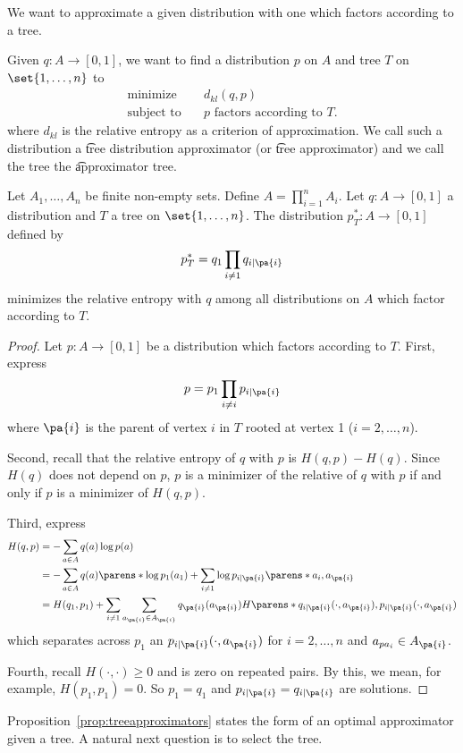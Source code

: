 

We want to approximate a given distribution with one which factors according to a tree.


Given $q: A \to [0, 1]$, we want to find a distribution $p$ on $A$ and tree $T$ on $\set{1, \dots , n}$ to
  \[
\begin{aligned}
\text{minimize} & \quad d_{kl}(q, p) \\
\text{subject to} & \quad p \text{ factors according to } T.
\end{aligned}
  \]
where $d_{kl}$ is the relative entropy as a criterion of approximation.
We call such a distribution a \t{tree distribution approximator} (or \t{tree approximator}) and we call the tree the \t{approximator tree}.


\begin{prop}

Let $A_1, \dots , A_n$ be finite non-empty sets.
Define $A = \prod_{i = 1}^{n} A_i$.
Let $q: A \to [0, 1]$ a distribution and $T$ a tree on $\set{1, \dots , n}$.
The distribution $p^*_T: A \to [0, 1]$ defined by
  \[
p^*_T = q_1 \prod_{i \neq 1} q_{i \mid \pa{i}}
  \]
minimizes the relative entropy with $q$ among all distributions on $A$ which factor according to $T$.

\begin{proof}

Let $p: A \to [0, 1]$ be a distribution which factors according to $T$.
First, express
  \[
p = p_1 \prod_{i \neq i} p_{i \mid \pa{i}}
  \]
where $\pa{i}$ is the parent of vertex $i$ in $T$ rooted at vertex 1 ($i = 2, \dots , n$).

Second, recall that the relative entropy of $q$ with $p$ is $H(q, p) - H(q)$.
Since $H(q)$ does not depend on $p$, $p$ is a minimizer of the relative of $q$ with $p$ if and only if $p$ is a minimizer of $H(q, p)$.

Third, express
  \[
\begin{aligned}
H(q, p) &= - \sum_{a \in A} q(a) \log p(a) \\
&= - \sum_{a \in A} q(a) \parens*{\log p_1(a_1) + \sum_{i \neq 1} \log p_{i \mid \pa{i}}\parens*{a_i, a_{\pa{i}}}} \\
&= H(q_1, p_1) + \sum_{i \neq 1} \sum_{a_{\pa{i}} \in A_{\pa{i}}} q_{\pa{i}}(a_{\pa{i}})H\parens*{q_{i\mid\pa{i}}(\cdot, a_{\pa{i}}), p_{i\mid\pa{i}}(\cdot, a_{\pa{i}})}
\end{aligned}
  \]
which separates across $p_1$ an $p_{i \mid \pa{i}}(\cdot, a_{\pa{i}})$ for $i = 2, \dots , n$ and $a_{pa_{i}} \in A_{\pa{i}}$.

Fourth, recall $H(\cdot, \cdot) \geq 0$ and is zero on repeated pairs.
By this, we mean, for example, $H(p_1, p_1) = 0$.
So $p_1 = q_1$ and $p_{i \mid \pa{i}} = q_{i \mid \pa{i}}$ are solutions.

\end{proof}

\label{prop:treeapproximators}
\end{prop}

Proposition~\ref{prop:treeapproximators} states the form of an optimal approximator given a tree.
A natural next question is to select the tree.
